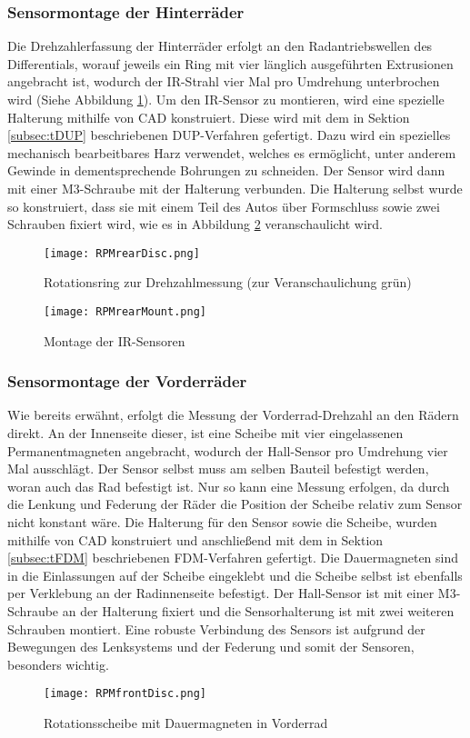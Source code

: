 \subsubsection{Sensormontage der Hinterräder}
\label{subsubsec:RPMmountRear}
Die Drehzahlerfassung der Hinterräder erfolgt an den Radantriebswellen des Differentials, worauf jeweils ein Ring mit vier länglich ausgeführten Extrusionen angebracht ist, wodurch der \ac{IR}-Strahl vier Mal pro Umdrehung unterbrochen wird (Siehe Abbildung \ref{fig:RPMrearDisc}). Um den \ac{IR}-Sensor zu montieren, wird eine spezielle Halterung mithilfe von \ac{CAD} konstruiert. Diese wird mit dem in Sektion \ref{subsec:tDUP} beschriebenen \ac{DUP}-Verfahren gefertigt. Dazu wird ein spezielles mechanisch bearbeitbares Harz verwendet, welches es ermöglicht, unter anderem Gewinde in dementsprechende Bohrungen zu schneiden. Der Sensor wird dann mit einer M3-Schraube mit der Halterung verbunden. Die Halterung selbst wurde so konstruiert, dass sie mit einem Teil des Autos über Formschluss sowie zwei Schrauben fixiert wird, wie es in Abbildung \ref{fig:RPMrearMount} veranschaulicht wird.
\begin{figure}[h]
\centering
\texttt{[image: RPMrearDisc.png]}
\caption{Rotationsring zur Drehzahlmessung (zur Veranschaulichung grün)}
\label{fig:RPMrearDisc}
\end{figure}
\newpage
\begin{figure}[h]
\centering
\texttt{[image: RPMrearMount.png]}
\caption{Montage der \ac{IR}-Sensoren}
\label{fig:RPMrearMount}
\end{figure}

\subsubsection{Sensormontage der Vorderräder}
\label{subsubsec:RPMmountFront}
Wie bereits erwähnt, erfolgt die Messung der Vorderrad-Drehzahl an den Rädern direkt. An der Innenseite dieser, ist eine Scheibe mit vier eingelassenen Permanentmagneten angebracht, wodurch der Hall-Sensor pro Umdrehung vier Mal ausschlägt. Der Sensor selbst muss am selben Bauteil befestigt werden, woran auch das Rad befestigt ist. Nur so kann eine Messung erfolgen, da durch die Lenkung und Federung der Räder die Position der Scheibe relativ zum Sensor nicht konstant wäre. Die Halterung für den Sensor sowie die Scheibe, wurden mithilfe von \ac{CAD} konstruiert und anschließend mit dem in Sektion \ref{subsec:tFDM} beschriebenen \ac{FDM}-Verfahren gefertigt. Die Dauermagneten sind in die Einlassungen auf der Scheibe eingeklebt und die Scheibe selbst ist ebenfalls per Verklebung an der Radinnenseite befestigt. Der Hall-Sensor ist mit einer M3-Schraube an der Halterung fixiert und die Sensorhalterung ist mit zwei weiteren Schrauben montiert. Eine robuste Verbindung des Sensors ist aufgrund der Bewegungen des Lenksystems und der Federung und somit der Sensoren, besonders wichtig.
\newpage
\begin{figure}[h]
\centering
\texttt{[image: RPMfrontDisc.png]}
\caption{Rotationsscheibe mit Dauermagneten in Vorderrad}
\label{fig:RPMfrontDisc}
\end{figure}

